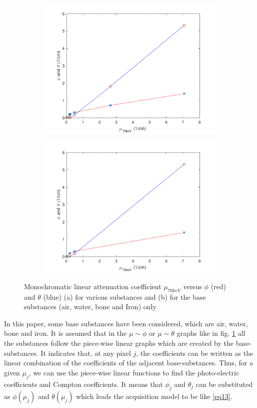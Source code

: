 \begin{figure}
\begin{subfigure}{.5\textwidth}
  \centering
  \includegraphics[width=3.1 in]{"deman1"}
  \caption{}
  \label{deman1}
\end{subfigure}%
\begin{subfigure}{.5\textwidth}
  \centering
  \includegraphics[width=3.1 in]{"deman2"}
  \caption{}
  \label{deman2}
\end{subfigure}
\caption{Monochromatic linear attenuation coefficient $\mu_{70keV}$ versus $\phi$ (red) and  $\theta$ (blue) (a) for various substances and (b) for the base substances (air, water, bone and Iron) only}
\label{fig}
\end{figure}


In this paper, some base substances have been considered, which are air, water, bone and iron. It is assumed that in the $\mu\sim\phi$ or $\mu\sim\theta$ graphs like in fig. \ref{deman1} all the substances follow the piece-wise linear graphs which are created by the base-substances. It indicates that, at any pixel $j$, the coefficients can be written as the linear combination of the coefficients of the adjacent base-substances. Thus, for a given $\mu_j$, we can use the piece-wise linear functions to find the photo-electric coefficients and Compton coefficients. It means that $\phi_j$ and $\theta_j$ can be substituted as $\phi(\mu_j)$ and $\theta(\mu_j)$ which leads the acquisition model to be like \ref{eq13}.

